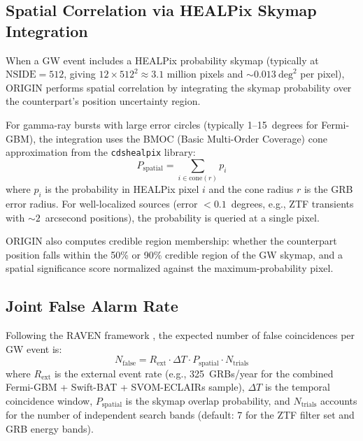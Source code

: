 \documentclass[twocolumn]{article}
\begin{document}
\subsection{Spatial Correlation via HEALPix Skymap Integration} \label{sec:spatial}

When a GW event includes a HEALPix probability skymap (typically at $\mathrm{NSIDE} = 512$, giving $12 \times 512^2 \approx 3.1$ million pixels and ${\sim}0.013~\mathrm{deg}^2$ per pixel), ORIGIN performs spatial correlation by integrating the skymap probability over the counterpart's position uncertainty region.

For gamma-ray bursts with large error circles (typically 1--15~degrees for Fermi-GBM), the integration uses the BMOC (Basic Multi-Order Coverage) cone approximation from the \texttt{cdshealpix} library:
\begin{equation} \label{eq:pspatial}
    P_\mathrm{spatial} = \sum_{i \in \mathrm{cone}(r)} p_i
\end{equation}
where $p_i$ is the probability in HEALPix pixel $i$ and the cone radius $r$ is the GRB error radius. For well-localized sources (error $< 0.1$~degrees, e.g., ZTF transients with ${\sim}2$~arcsecond positions), the probability is queried at a single pixel.

ORIGIN also computes credible region membership: whether the counterpart position falls within the 50\% or 90\% credible region of the GW skymap, and a spatial significance score normalized against the maximum-probability pixel.

\subsection{Joint False Alarm Rate} \label{sec:far}

Following the RAVEN framework \citep{Urban2016}, the expected number of false coincidences per GW event is:
\begin{equation} \label{eq:farjoint}
    N_\mathrm{false} = R_\mathrm{ext} \cdot \Delta T \cdot P_\mathrm{spatial} \cdot N_\mathrm{trials}
\end{equation}
where $R_\mathrm{ext}$ is the external event rate (e.g., 325~GRBs/year for the combined Fermi-GBM + Swift-BAT + SVOM-ECLAIRs sample), $\Delta T$ is the temporal coincidence window, $P_\mathrm{spatial}$ is the skymap overlap probability, and $N_\mathrm{trials}$ accounts for the number of independent search bands (default: 7 for the ZTF filter set and GRB energy bands).
\end{document}
